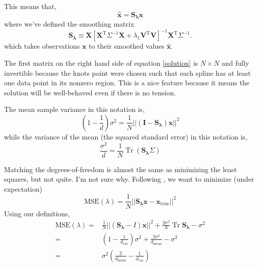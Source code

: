 \documentclass[10pt,journal]{IEEEtran}
\DeclareMathOperator{\Tr}{Tr}
\begin{document}
This means that,
\begin{equation}
\mathbf{\hat{x}} = \mathbf{S_\lambda} \mathbf{x}
\end{equation}
where we've defined the smoothing matrix
\begin{equation}
\label{smoothing-operator}
\mathbf{S_\lambda} \equiv \mathbf{X} \left[ \mathbf{X}^{\textrm{T}} \Sigma^{-1} \mathbf{X} + \lambda_1 \mathbf{V}^{\textrm{T}} \mathbf{V} \right]^{-1} \mathbf{X}^{\textrm{T}} \Sigma^{-1}.
\end{equation}
which takes observations $\mathbf{x}$ to their smoothed values $\mathbf{\hat{x}}$.

The first matrix on the right hand side of equation \ref{solution} is $N\times N$ and fully invertible because the knots point were chosen such that each spline has at least one data point in its nonzero region. This is a nice feature because it means the solution will be well-behaved even if there is no tension.

The mean sample variance in this notation is,
\begin{equation}
    \left(1-\frac{1}{d} \right)\sigma^2 = \frac{1}{N} || \left( \mathbf{I} - \mathbf{S_\lambda} \right) \mathbf{x} ||^2
\end{equation}
while the variance of the mean (the squared standard error) in this notation is,
\begin{equation}
    \frac{\sigma^2}{d} = \frac{1}{N} \Tr \left( \mathbf{S_\lambda} \Sigma \right)
\end{equation}


Matching the degrees-of-freedom is almost the same as minimizing the least squares, but not quite. I'm not sure why. Following \cite{craven1979-nm}, we want to minimize (under expectation)
\begin{equation}
    \textrm{MSE}(\lambda) = \frac{1}{N} || \mathbf{S_\lambda}\mathbf{x} - \mathbf{x}_{\textrm{true}} ||^2
\end{equation}
Using our definitions,
\begin{align}
    \textrm{MSE}(\lambda) =& \frac{1}{N} || \left( \mathbf{S_\lambda} - I \right) \mathbf{x} ||^2 + \frac{2 \sigma^2}{N}  \Tr \mathbf{S_\lambda} - \sigma^2 \\
    =&  \left(1-\frac{1}{d_{\textrm{var}}} \right)\sigma^2 + \frac{2 \sigma^2}{d_\textrm{mean}} - \sigma^2 \\
    =& \sigma^2 \left( \frac{2}{d_\textrm{mean}} -\frac{1}{d_{\textrm{var}}} \right)
\end{align}
\end{document}
